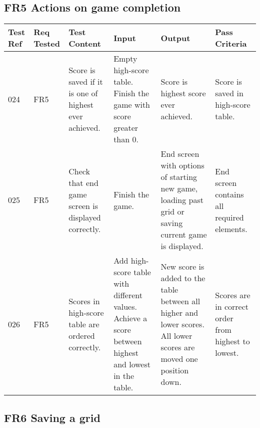 \documentclass{project}
\begin{document}
\subsection{FR5 Actions on game completion}

\begin{longtable}{|p{0.7cm}|p{1cm}|p{3.5cm}|p{3.2cm}|p{3.5cm}|p{3.5cm}|}
\hline
Test Ref & Req Tested & Test Content & Input  & Output & Pass Criteria \\ \hline \hline

024 & FR5 & Score is saved if it is one of highest ever achieved. & Empty high-score table. Finish the game with score greater than 0.
& Score is highest score ever achieved. & Score is saved in high-score table. \\ \hline

025 & FR5 & Check that end game screen is displayed correctly. & Finish the game. & End screen with options of starting new game, loading past grid or saving current game is displayed.
& End screen contains all required elements. \\ \hline

026 & FR5 & Scores in high-score table are ordered correctly. & Add high-score table with different values. Achieve a score between highest and lowest in the table.
& New score is added to the table between all higher and lower scores. All lower scores are moved one position down.
& Scores are in correct order from highest to lowest. \\ \hline

\end{longtable}

\subsection{FR6 Saving a grid}
\end{document}
